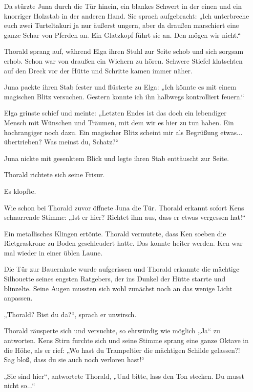 Da stürzte Juna durch die Tür hinein, ein blankes Schwert in der einen und ein knorriger Holzstab in der anderen Hand. Sie sprach aufgebracht: „Ich unterbreche euch zwei Turteltakuri ja nur äußerst ungern, aber da draußen marschiert eine ganze Schar von Pferden an. Ein Glatzkopf führt sie an. Den mögen wir nicht.“

Thorald sprang auf, während Elga ihren Stuhl zur Seite schob und sich sorgsam erhob. Schon war von draußen ein Wiehern zu hören. Schwere Stiefel klatschten auf den Dreck vor der Hütte und Schritte kamen immer näher.

Juna packte ihren Stab fester und flüsterte zu Elga: „Ich könnte es mit einem magischen Blitz versuchen. Gestern konnte ich ihn halbwegs kontrolliert feuern.“

Elga grinste schief und meinte: „Letzten Endes ist das doch ein lebendiger Mensch mit Wünschen und Träumen, mit dem wir es hier zu tun haben. Ein hochrangiger noch dazu. Ein magischer Blitz scheint mir als Begrüßung etwas... übertrieben? Was meinst du, Schatz?“

Juna nickte mit gesenktem Blick und legte ihren Stab enttäuscht zur Seite.

Thorald richtete sich seine Frisur.

Es klopfte.

Wie schon bei Thorald zuvor öffnete Juna die Tür. Thorald erkannt sofort Kens schnarrende Stimme: „Ist er hier? Richtet ihm aus, dass er etwas vergessen hat!“

Ein metallisches Klingen ertönte. Thorald vermutete, dass Ken soeben die Rietgraskrone zu Boden geschleudert hatte. Das konnte heiter werden. Ken war mal wieder in einer üblen Laune.

Die Tür zur Bauernkate wurde aufgerissen und Thorald erkannte die mächtige Silhouette seines engsten Ratgebers, der ins Dunkel der Hütte starrte und blinzelte. Seine Augen mussten sich wohl zunächst noch an das wenige Licht anpassen.

„Thorald? Bist du da?“, sprach er unwirsch.

Thorald räusperte sich und versuchte, so ehrwürdig wie möglich „Ja“ zu antworten. Kens Stirn furchte sich und seine Stimme sprang eine ganze Oktave in die Höhe, als er rief: „Wo hast du Trampeltier die mächtigen Schilde gelassen?! Sag bloß, dass du sie auch noch verloren hast!“

„Sie sind hier“, antwortete Thorald, „Und bitte, lass den Ton stecken. Du musst nicht so...“

